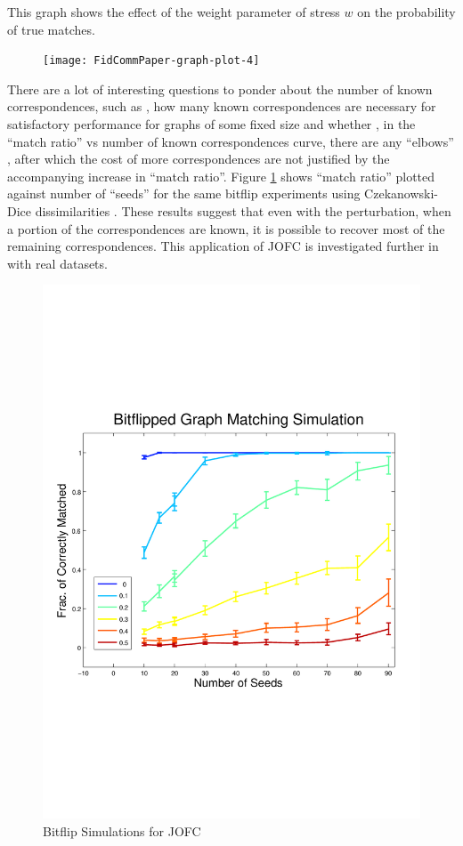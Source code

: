 \documentclass[12pt,oneside,final]{thesis}\usepackage[]{graphicx}\usepackage[]{color}
\begin{document}
This graph shows the effect of the weight parameter of stress $w$ on the probability of true matches.
\begin{figure}
\texttt{[image: FidCommPaper-graph-plot-4]}
\end{figure}
There are a lot  of interesting questions to ponder about the number of known correspondences, such as , how many known correspondences are necessary for satisfactory performance for graphs of some fixed size and whether , in the ``match ratio'' vs number of known correspondences curve,  there are any ``elbows'' , after which the cost of more correspondences are not justified by the accompanying increase in ``match ratio''. Figure \ref{bitflipJOFC} shows ``match ratio'' plotted against number of ``seeds'' for the same bitflip experiments using  Czekanowski-Dice dissimilarities . These results suggest that even with the perturbation, when a portion of the correspondences are known, it is possible to recover most of the remaining correspondences. This application of JOFC is  investigated further in \cite{SGMviaJOFC} with real datasets.
\begin{figure}
\includegraphics[scale=0.75]{bitflip_JOFC}
\caption{Bitflip Simulations for JOFC \label{bitflipJOFC}}
\end{figure}
\end{document}
